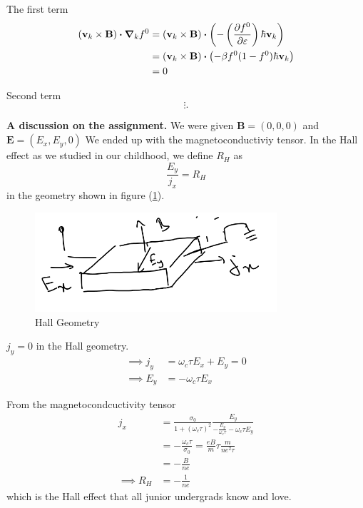 \documentclass[a4paper]{article}
\newcommand{\hcut}{\hbar}
\begin{document}
The first term
\begin{equation}
	\label{firstterm}
	\begin{split}
		\left( \mathbf{v}_k \times  \mathbf{B} \right) \vdot \grad_k f^{0} &= \left( \mathbf{v}_k \times  \mathbf{B} \right) \vdot\left( -\left( \pdv{f^{0}}{\varepsilon} \right) \hcut \mathbf{v}_k \right) \\
										 &=	\left( \mathbf{v}_k \times  \mathbf{B} \right) \vdot \left( -\beta f^{0}(1 - f^{0})\hcut \mathbf{v}_k \right) \\
										 &= 0
	\end{split}
\end{equation}

Second term
\[
\vdots
.\] 

\textbf{A discussion on the assignment.} We were given $\mathbf{B}
= \left( 0, 0, 0 \right) $ and $\mathbf{E} = \left( E_x, E_y, 0 \right)  $
We ended up with the magnetoconductiviy tensor. In the Hall effect
as we studied in our childhood, we define $R_H$ as 
\begin{equation}
	\frac{E_y}{j_x} = R_H
\end{equation}
in the geometry shown in figure {(\ref{hallgeom})}.
\begin{figure}[h]
	\centering
	\includegraphics[width=0.8\textwidth]{figures/hallgeom.png}
	\caption{Hall Geometry}
	\label{hallgeom}
\end{figure}

$ j_y = 0$ in the Hall geometry.
\begin{equation}
	\begin{split}
		\implies j_y &= \omega_c \tau E_x + E_y = 0\\
		\implies E_y &=  -\omega_c \tau E_x 
	\end{split}
\end{equation}

From the magnetocondcuctivity tensor 
\begin{equation}
	\begin{split}
		j_{x} &= \frac{\sigma_0}{1  + \left( \omega_c \tau \right) ^2}
	\frac{E_y}{-\frac{E_y}{\omega_c \tau} - \omega_c\tau E_y}\\
	&= -\frac{\omega_c\tau}{\sigma_0} = \frac{eB}{m}\tau \frac{m}{ne^2\tau}\\
	&=  -\frac{B}{ne} \\
	\implies R_H &= -\frac{1}{ne}
	\end{split}
\end{equation}
which is the Hall effect that all junior undergrads know and love.
\end{document}
